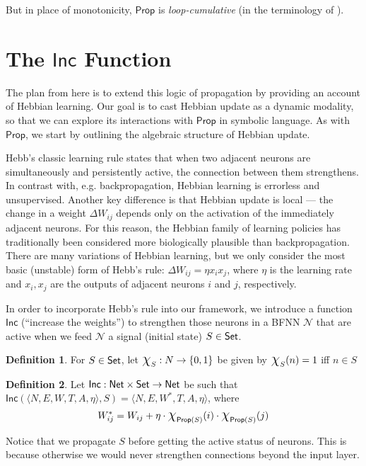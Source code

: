 \documentclass[12pt]{article}
\newcommand{\Set}{\mbox{\sf Set}}
\theoremstyle{definition}
\newtheorem{definition}{Definition}
\newcommand{\set}[1]{\{ #1 \}}
\newcommand{\Prop}{\textsf{Prop}}
\newcommand{\Inc}{\textsf{Inc}}
\newcommand{\AllNets}{\mathsf{Net}}
\newcommand{\Net}{\mathcal{N}}
\newcommand*{\bigchi}{\mbox{\Large$\chi$}}%
\begin{document}
But in place of monotonicity, $\Prop$ is \emph{loop-cumulative} (in the terminology of \cite{kraus1990nonmonotonic}).

\section{\textcolor{myblue}{The $\Inc$ Function}}

The plan from here is to extend this logic of propagation by providing an account of Hebbian learning.  Our goal is to cast Hebbian update as a dynamic modality, so that we can explore its interactions with $\Prop$ in symbolic language.  As with $\Prop$, we start by outlining the algebraic structure of Hebbian update.

Hebb's classic learning rule \cite{hebb-organization-of-behavior-1949} states that when two adjacent neurons are simultaneously and persistently active, the connection between them strengthens.  In contrast with, e.g. backpropagation, Hebbian learning is errorless and unsupervised.  Another key difference is that Hebbian update is local --- the change in a weight $\Delta W_{ij}$ depends only on the activation of the immediately adjacent neurons.  For this reason, the Hebbian family of learning policies has traditionally been considered more biologically plausible than backpropagation.  There are many variations of Hebbian learning, but we only consider the most basic (unstable) form of Hebb's rule:  $\Delta W_{ij} = \eta x_i x_j$, where $\eta$ is the learning rate and $x_i, x_j$ are the outputs of adjacent neurons $i$ and $j$, respectively.

In order to incorporate Hebb's rule into our framework, we introduce a function $\Inc$ (``increase the weights'') to strengthen those neurons in a BFNN $\Net$ that are active when we feed $\Net$ a signal (initial state) $S \in \Set$.  
\begin{definition}
For $S \in \Set$, let 
$\bigchi_S : N \to \set{0, 1}$ be given by $\bigchi_S(n) = 1$ iff $n \in S$
\end{definition}

\begin{definition}
Let $\Inc : \AllNets \times \Set \to \AllNets$ be such that $\Inc(\langle N, E, W, T, A, \eta \rangle, S) = \langle N, E, W^\ast, T, A, \eta \rangle$, where
\[
    W_{ij}^\ast = W_{ij} + \eta \cdot \bigchi_{\Prop(S)}(i) \cdot  \bigchi_{\Prop(S)}(j)
\]
\end{definition}
Notice that we propagate $S$ before getting the active status of neurons.  
This is because otherwise
we would never strengthen connections beyond the input layer.
\end{document}
